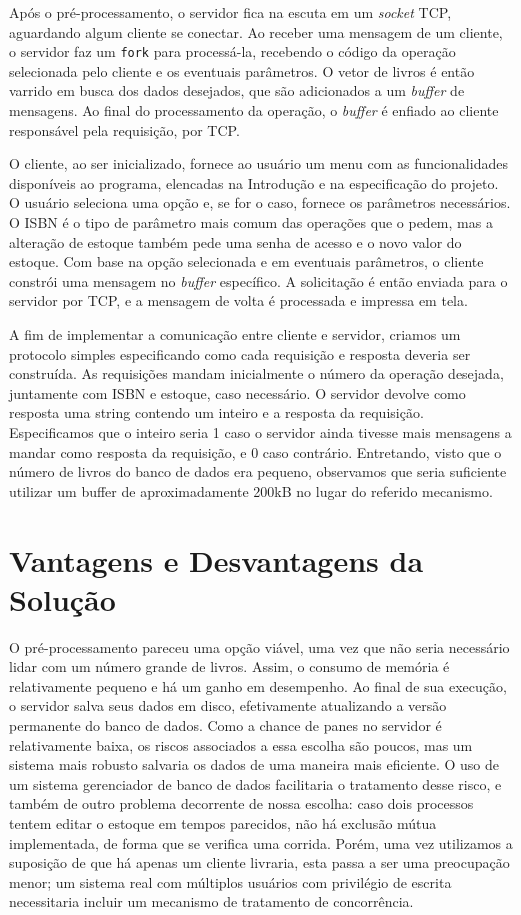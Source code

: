 \documentclass[11pt, brazil]{article} %
\begin{document}
Após o pré-processamento, o servidor fica na escuta em um \emph{socket} TCP, aguardando algum cliente se conectar. 
Ao receber uma mensagem de um cliente, o servidor faz um \texttt{fork} para processá-la, recebendo o código da operação selecionada pelo cliente e os eventuais parâmetros.
O vetor de livros é então varrido em busca dos dados desejados, que são adicionados a um \emph{buffer} de mensagens.
Ao final do processamento da operação, o \emph{buffer} é enfiado ao cliente responsável pela requisição, por TCP.

O cliente, ao ser inicializado, fornece ao usuário um menu com as funcionalidades disponíveis ao programa, elencadas na Introdução e na especificação do projeto. 
O usuário seleciona uma opção e, se for o caso, fornece os parâmetros necessários.
O ISBN é o tipo de parâmetro mais comum das operações que o pedem, mas a alteração de estoque também pede uma senha de acesso e o novo valor do estoque. 
Com base na opção selecionada e em eventuais parâmetros, o cliente constrói uma mensagem no \emph{buffer} específico. 
A solicitação é então enviada para o servidor por TCP, e a mensagem de volta é processada e impressa em tela.

A fim de implementar a comunicação entre cliente e servidor, criamos um protocolo simples especificando como cada requisição e resposta deveria ser
construída. As requisições mandam inicialmente o número da operação desejada, juntamente com ISBN e estoque, caso necessário. O servidor devolve
como resposta
uma string contendo um inteiro e a resposta da requisição. Especificamos que o inteiro seria 1 caso o servidor ainda tivesse mais mensagens
a mandar como resposta da requisição, e 0 caso contrário. Entretando, visto que o número de livros do banco de dados era pequeno, observamos que
seria suficiente utilizar um buffer de aproximadamente 200kB no lugar do referido mecanismo.


\section{Vantagens e Desvantagens da Solução}

O pré-processamento pareceu uma opção viável, uma vez que não seria necessário lidar com um número grande de livros. Assim, o consumo de memória é relativamente pequeno e há um ganho em desempenho. 
Ao final de sua execução, o servidor salva seus dados em disco, efetivamente atualizando a versão permanente do banco de dados.
Como a chance de panes no servidor é relativamente baixa, os riscos associados a essa escolha são poucos, mas um sistema mais robusto salvaria os dados de uma maneira mais eficiente. 
O uso de um sistema gerenciador de banco de dados facilitaria o tratamento desse risco, e também de outro problema decorrente de nossa escolha: caso dois processos tentem editar o estoque em tempos parecidos, não há exclusão mútua implementada, de forma que se verifica uma corrida.
Porém, uma vez utilizamos a suposição de que há apenas um cliente livraria, esta passa a ser uma preocupação menor; um sistema real com múltiplos usuários
com privilégio de escrita necessitaria incluir um mecanismo de tratamento de concorrência.
\end{document}

